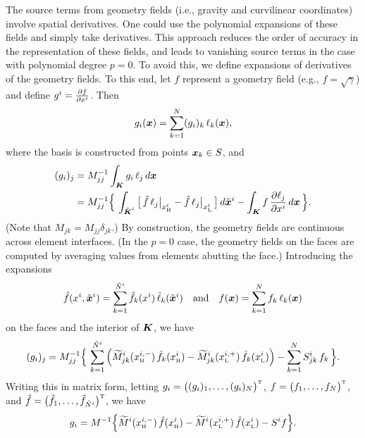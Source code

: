 \documentclass[10pt,preprint]{aastex}
\begin{document}
The source terms from geometry fields (i.e., gravity and curvilinear coordinates) involve spatial derivatives.  
One could use the polynomial expansions of these fields and simply take derivatives.  
This approach reduces the order of accuracy in the representation of these fields, and leads to vanishing source terms in the case with polynomial degree $p=0$.  
To avoid this, we define expansions of derivatives of the geometry fields.  
To this end, let $f$ represent a geometry field (e.g., $f=\sqrt{\gamma}$) and define $g^{i}=\frac{\partial f}{\partial x^{i}}$.  
Then
\begin{equation}
  g_{i}(\boldsymbol{x})=\sum_{k=1}^{N}(g_{i})_{k}\,\ell_{k}(\boldsymbol{x}),
\end{equation}
where the basis is constructed from points $\boldsymbol{x}_{k}\in S$, and
\begin{align}
  (g_{i})_{j}
  &=M_{jj}^{-1}\int_{\boldsymbol{K}}g_{i}\,\ell_{j}\,d\boldsymbol{x} \nonumber \\
  &=M_{jj}^{-1}
  \Big\{\,
    \int_{\tilde{\boldsymbol{K}}^{i}}\big[\,\hat{f}\,\ell_{j}\big|_{x_{\mbox{\tiny H}}^{i}}-\hat{f}\,\ell_{j}\big|_{x_{\mbox{\tiny L}}^{i}}\,\big]\,d\tilde{\boldsymbol{x}}^{i}
    -\int_{\boldsymbol{K}}f\,\frac{\partial \ell_{j}}{\partial x^{i}}\,d\boldsymbol{x}
  \,\Big\}.  
\end{align}
(Note that $M_{jk}=M_{jj}\delta_{jk}$.)
By construction, the geometry fields are continuous across element interfaces.  
(In the $p=0$ case, the geometry fields on the faces are computed by averaging values from elements abutting the face.)  
Introducing the expansions
\begin{equation}
  \hat{f}(x^{i},\tilde{\boldsymbol{x}}^{i})=\sum_{k=1}^{\tilde{N}^{i}}\hat{f}_{k}(x^{i})\,\tilde{\ell}_{k}(\tilde{\boldsymbol{x}}^{i})
  \quad\text{and}\quad
  f(\boldsymbol{x})=\sum_{k=1}^{N}f_{k}\,\ell_{k}(\boldsymbol{x})
\end{equation}
on the faces and the interior of $\boldsymbol{K}$, we have
\begin{equation}
  (g_{i})_{j}=M_{jj}^{-1}
  \Big\{\,
    \sum_{k=1}^{\tilde{N}^{i}}
    \Big(
      \widetilde{M}_{jk}^{i}(x_{\mbox{\tiny H}}^{i,-})\,\hat{f}_{k}(x_{\mbox{\tiny H}}^{i})
      -\widetilde{M}_{jk}^{i}(x_{\mbox{\tiny L}}^{i,+})\,\hat{f}_{k}(x_{\mbox{\tiny L}}^{i})
    \Big)
    -\sum_{k=1}^{N}S_{jk}^{i}\,f_{k}
  \,\Big\}.  
  \label{eq:geometryDerivative}
\end{equation}
Writing this in matrix form, letting $g_{i}=\big((g_{i})_{1},\ldots,(g_{i})_{N}\big)^{\mbox{\tiny T}}$, $f=\big(f_{1},\ldots,f_{N}\big)^{\mbox{\tiny T}}$, and $\hat{f}=\big(\hat{f}_{1},\ldots,\hat{f}_{\tilde{N}^{i}}\big)^{\mbox{\tiny T}}$, we have
\begin{equation}
  g_{i}=M^{-1}\Big\{\widetilde{M}^{i}(x_{\mbox{\tiny H}}^{i,-})\,\hat{f}(x_{\mbox{\tiny H}}^{i})-\widetilde{M}^{i}(x_{\mbox{\tiny L}}^{i,+})\,\hat{f}(x_{\mbox{\tiny L}}^{i})-S^{i}f\Big\}.  
\end{equation}
\end{document}
